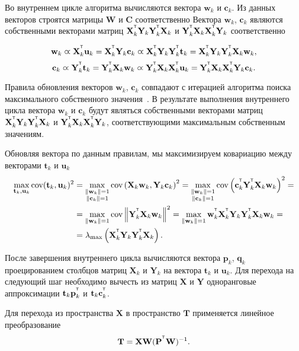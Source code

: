 \documentclass[12pt,twoside]{article}
\newcommand{\bw}{\mathbf{w}}
\newcommand{\bY}{\mathbf{Y}}
\newcommand{\bX}{\mathbf{X}}
\newcommand{\bu}{\mathbf{u}}
\newcommand{\bt}{\mathbf{t}}
\newcommand{\bp}{\mathbf{p}}
\newcommand{\bq}{\mathbf{q}}
\newcommand{\bc}{\mathbf{c}}
\newcommand{\bP}{\mathbf{P}}
\newcommand{\bT}{\mathbf{T}}
\newcommand{\bC}{\mathbf{C}}
\newcommand{\bW}{\mathbf{W}}
\begin{document}
Во внутреннем цикле алгоритма вычисляются вектора $\bw_k$ и $\bc_k$. Из данных векторов строятся матрицы $\bW$ и $\bC$ соответственно
Вектора $\bw_k$, $\bc_k$ являются собственными векторами матриц $\bX_k^{\T} \bY_k \bY_k^{\T} \bX_k$ и $\bY_k^{\T} \bX_k \bX_k^{\T} \bY_k$ соответственно

\begin{equation*}
    \bw_k \varpropto \bX_k^{\T} \bu_k = \bX_k^{\T} \bY_k \bc_k \varpropto \bX_k^{\T} \bY_k \bY_k^{\T} \bt_k = \bX_k^{\T} \bY_k \bY_k^{\T} \bX_k \bw_k,
\end{equation*}
\begin{equation*}
    \bc_k \varpropto \bY_k^{\T} \bt_k = \bY_k^{\T} \bX_k \bw_k \varpropto \bY_k^{\T} \bX_k \bX_k^{\T} \bu_k = \bY_k^{\T} \bX_k \bX_k^{\T} \bY_k \bc_k.
\end{equation*}

Правила обновления векторов $\bw_k$, $\bc_k$ совпадают с итерацией алгоритма поиска максимального собственного значения~\cite{Mises1929}. В результате выполнения внутреннего цикла вектора $\bw_k$ и $\bc_k$ будут являться собственными векторами матриц $\bX_k^{\T} \bY_k \bY_k^{\T} \bX_k$ и $\bY_k^{\T} \bX_k \bX_k^{\T} \bY_k$, соответствующими максимальным собственным значениям.

Обновляя вектора по данным правилам, мы максимизируем ковариацию между векторами $\bt_k$ и $\bu_k$
\begin{align*}
    \max_{\bt_k, \bu_k}  \text{cov} (\bt_k, \bu_k)^2 &= \max_{\substack{\|\bw_k\|=1 \\ \|\bc_k\| = 1}} \text{cov} \left( \bX_k \bw_k, \bY_k \bc_k \right)^2 = \max_{\substack{\|\bw_k\|=1 \\ \|\bc_k\| = 1}} \text{cov} \left(\bc_k^{\T}  \bY_k^{\T} \bX_k \bw_k \right)^2 = \\
    &= \max_{\|\bw_k\| = 1} \text{cov} \left\|\bY_k^{\T} \bX_k \bw_k \right\|^2 = \max_{\|\bw_k\| = 1} \bw_k^{\T} \bX_k^{\T} \bY_k \bY_k^{\T} \bX_k \bw_k = \\
    & = \lambda_{\max} \left( \bX_k^{\T} \bY_k \bY_k^{\T} \bX_k \right).
\end{align*}

После завершения внутреннего цикла вычисляются вектора $\bp_k$, $\bq_k$ проецированием столбцов матриц $\bX_k$ и $\bY_k$ на вектора $\bt_k$ и $\bu_k$. Для перехода на следующий шаг необходимо вычесть из матриц $\bX$ и $\bY$ одноранговые аппроксимации $\bt_k \bp_k^{\T}$ и $\bt_k \bc_k^{\T}$.

Для перехода из пространства $\bX$ в пространство $\bT$ применяется линейное преобразование
\[
	\bT = \bX \bW (\bP^{\T} \bW)^{-1}.
\]
\end{document}
